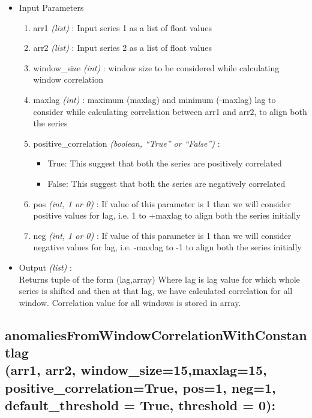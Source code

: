 \begin{itemize}
 \item Input Parameters
 
 \begin{enumerate}
  \item arr1 \textit{(list)} : Input series 1 as a list of float values
  \item arr2 \textit{(list)} : Input series 2 as a list of float values
  \item window\_size \textit{(int)} : window size to be considered while 
calculating window correlation
  \item maxlag \textit{(int)} : maximum (maxlag) and minimum (-maxlag) lag to 
consider while calculating correlation between arr1 and arr2, to align both the 
series
  \item positive\_correlation \textit{(boolean, ``True'' or ``False'')} : 
      \begin{itemize}
       \item True: This suggest that both the series are positively correlated
       \item False: This suggest that both the series are negatively correlated
      \end{itemize}
      
  \item pos \textit{(int, 1 or 0)} : If value of this parameter is 1 than we 
will consider positive values for lag, i.e. 1 to +maxlag to align both the 
series initially
  \item neg \textit{(int, 1 or 0)} : If value of this parameter is 1 than we 
will consider negative values for lag, i.e. -maxlag to -1 to align both the 
series initially
  
 \end{enumerate}

 \item Output \textit{(list)} : \\
  Returns tuple of the form (lag,array)
Where lag is lag value for which whole series is shifted and then at that lag, 
we have calculated correlation for all window. Correlation value for all 
windows is stored in array.
 
\end{itemize}

\subsection{anomaliesFromWindowCorrelationWithConstantlag\\(arr1, arr2, 
window\_size=15,maxlag=15, \\positive\_correlation=True, pos=1, neg=1, \\
default\_threshold = True, threshold = 0):}


